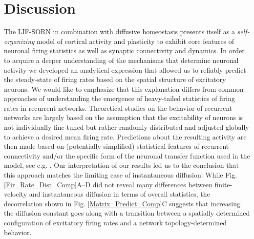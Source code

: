 \documentclass[10pt,letterpaper]{article}
\begin{document}
\section*{Discussion}
The LIF-SORN in combination with diffusive homeostasis presents itself as a \emph{self-organizing} model of cortical activity and plasticity to exhibit core features of neuronal firing statistics as well as synaptic connectivity and dynamics. In order to acquire a deeper understanding of the mechanisms that determine neuronal activity we developed an analytical expression that allowed us to reliably predict the steady-state of firing rates based on the spatial structure of excitatory neurons. We would like to emphasize that this explanation differs from common approaches of understanding the emergence of heavy-tailed statistics of firing rates in recurrent networks. Theoretical studies on the behavior of recurrent networks are largely based on the assumption that the excitability of neurons is not individually fine-tuned but rather randomly distributed and adjusted globally to achieve a desired mean firing rate. Predictions about the resulting activity are then made based on (potentially simplified) statistical features of recurrent connectivity and/or the specific form of the neuronal transfer function used in the model, see e.g. \cite{Roxin_Firing_Rate_Distribution,Vreeswijk1998,Koulakov_2009}. Our interpretation of our results led us to the conclusion that this approach matches the limiting case of instantaneous diffusion: While Fig. \ref{Fir_Rate_Dist_Comp}A--D did not reveal many differences between finite-velocity and instantaneous diffusion in terms of overall statistics, the decorrelation shown in Fig. \ref{Matrix_Predict_Comp}C suggests that increasing the diffusion constant goes along with a transition between a spatially determined configuration of excitatory firing rates and a network topology-determined behavior.
\end{document}

